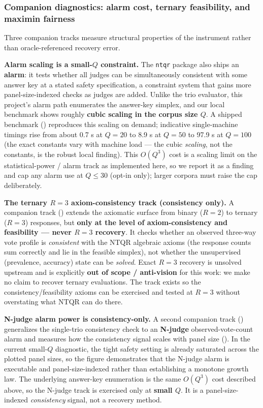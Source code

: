 \documentclass[
]{article}
\begin{document}
\subsubsection{Companion diagnostics: alarm cost, ternary feasibility,
and maximin
fairness}\label{companion-diagnostics-alarm-cost-ternary-feasibility-and-maximin-fairness}

Three companion tracks measure structural properties of the instrument
rather than oracle-referenced recovery error.

\textbf{Alarm scaling is a small-\(Q\) constraint.} The \texttt{ntqr}
package also ships an \textbf{alarm}: it tests whether all judges can be
simultaneously consistent with some answer key at a stated safety
specification, a constraint system that gains more panel-size-indexed
checks as judges are added. Unlike the trio evaluator, this project's
alarm path enumerates the answer-key simplex, and our local benchmark
shows roughly \textbf{cubic scaling in the corpus size \(Q\)}. A shipped
benchmark () reproduces this scaling on
demand; indicative single-machine timings rise from about 0.7 s at
\(Q=20\) to 8.9 s at \(Q=50\) to 97.9 s at \(Q=100\) (the exact
constants vary with machine load --- the cubic \emph{scaling}, not the
constants, is the robust local finding). This \(O(Q^3)\) cost is a
scaling limit on the statistical-power / alarm track as implemented
here, so we report it as a finding and cap any alarm use at \(Q\leq30\)
(opt-in only); larger corpora must raise the cap deliberately.

\textbf{The ternary \(R=3\) axiom-consistency track (consistency only).}
A companion track () extends the
axiomatic surface from binary (\(R=2\)) to ternary (\(R=3\)) responses,
but \textbf{only at the level of axiom-consistency and feasibility ---
never \(R=3\) recovery}. It checks whether an observed three-way vote
profile is \emph{consistent} with the NTQR algebraic axioms (the
response counts sum correctly and lie in the feasible simplex), not
whether the unsupervised (prevalence, accuracy) state can be
\emph{solved}. Exact \(R=3\) recovery is unsolved upstream and is
explicitly \textbf{out of scope / anti-vision} for this work: we make no
claim to recover ternary evaluations. The track exists so the
consistency/feasibility axioms can be exercised and tested at \(R=3\)
without overstating what NTQR can do there.

\textbf{N-judge alarm power is consistency-only.} A second companion
track () generalizes the
single-trio consistency check to an \textbf{N-judge} observed-vote-count
alarm and measures how the consistency signal scales with panel size
(). In the current small-\(Q\) diagnostic,
the tight safety setting is already saturated across the plotted panel
sizes, so the figure demonstrates that the N-judge alarm is executable
and panel-size-indexed rather than establishing a monotone growth law.
The underlying answer-key enumeration is the same \(O(Q^3)\) cost
described above, so the N-judge track is exercised only at \textbf{small
\(Q\)}. It is a panel-size-indexed \emph{consistency} signal, not a
recovery method.
\end{document}
